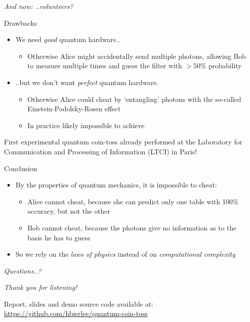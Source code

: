 \documentclass{beamer}
\begin{document}
\begin{frame}[plain,c]
    \begin{center}
        \Huge \emph{And now: ..volunteers?}
    \end{center}
\end{frame}


\begin{frame}{Drawbacks}
\begin{itemize}
    \item We need \emph{good} quantum hardware..
        \begin{itemize}
            \item Otherwise Alice might accidentally send multiple photons, allowing Bob to measure multiple times and guess the filter with $>50\%$ probability
        \end{itemize}
    \item ..but we don't want \emph{perfect} quantum hardware.
        \begin{itemize}
            \item Otherwise Alice could cheat by `entangling' photons with the so-called Einstein-Podolsky-Rosen effect
            \item In practice likely impossible to achieve
        \end{itemize}
\end{itemize}
First experimental quantum coin-toss already performed at the Laboratory for Communication and Processing of Information (LTCI) in Paris!
\end{frame}


\begin{frame}{Conclusion}
\begin{itemize}
    \item By the properties of quantum mechanics, it is impossible to cheat:
    \begin{itemize}
        \item Alice cannot cheat, because she can predict only one table with 100\% accuracy, but not the other
        \item Bob cannot cheat, because the photons give no information as to the basis he has to guess
    \end{itemize}
    \vfill
    \item So we rely on the \emph{laws of physics} instead of on \emph{computational complexity}
    \vfill
\end{itemize}
\end{frame}

\begin{frame}[plain,c]

\begin{center}
    \Huge \emph{Questions..?}
\end{center}

\end{frame}


\begin{frame}[plain,c]

\begin{center}
    \Huge \emph{Thank you for listening!}
    
\end{center}
\vfill
    \large
    Report, slides and demo source code available at:\\ \quad \url{https://github.com/hbierlee/quantum-coin-toss}
    
\end{frame}
\end{document}
